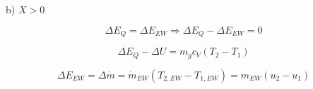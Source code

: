 b) $X > 0$

\[
\Delta E_Q = \Delta E_{EW} \Rightarrow \Delta E_Q - \Delta E_{EW} = 0
\]

\[
\Delta E_Q - \Delta U = m_g c_V (T_2 - T_1)
\]

\[
\Delta E_{EW} = \Delta \dot{m} = \dot{m}_{EW} (T_{2,EW} - T_{1,EW}) = m_{EW} (u_2 - u_1)
\]